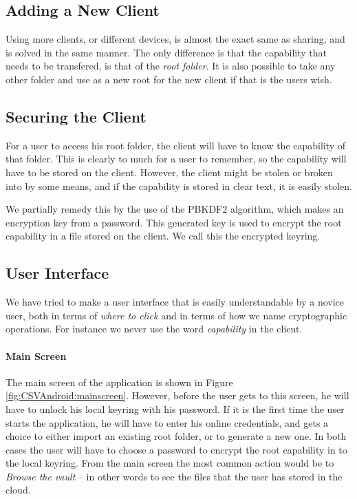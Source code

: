 \documentclass[pdftex,english,10pt,b5paper,twoside]{book}
\begin{document}
\subsection{Adding a New Client}

Using more clients, or different devices, is almost the exact same as sharing,
and is solved in the same manner. The only difference is that the capability
that needs to be transfered, is that of the \emph{root folder}. It is also
possible to take any other folder and use as a new root for the new client if
that is the users wish.

\subsection{Securing the Client}

For a user to access his root folder, the client will have to know the
capability of that folder. This is clearly to much for a user to remember, so
the capability will have to be stored on the client. However, the client might
be stolen or broken into by some means, and if the capability is stored in
clear text, it is easily stolen.

We partially remedy this by the use of the \ac{PBKDF2} algorithm, which makes
an encryption key from a password. This generated key is used to encrypt the
root capability in a file stored on the client. We call this the encrypted
keyring.

\subsection{User Interface}

We have tried to make a user interface that is easily understandable by a
novice user, both in terms of \emph{where to click} and in terms of how we name
cryptographic operations. For instance we never use the word \emph{capability}
in the client.

\paragraph{Main Screen}

The main screen of the application is shown in Figure
\ref{fig:CSVAndroid:mainscreen}. However, before the user gets to this screen,
he will have to unlock his local keyring with his password. If it is the first
time the user starts the application, he will have to enter his online
credentials, and gets a choice to either import an existing root folder, or to
generate a new one. In both cases the user will have to choose a password to
encrypt the root capability in to the local keyring. From the main screen the
most common action would be to \emph{Browse the vault} -- in other words to see
the files that the user has stored in the cloud.
\end{document}

